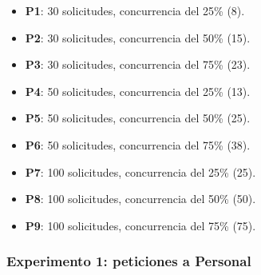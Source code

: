\begin{itemize}
	\item \textbf{P1}: 30 solicitudes, concurrencia del 25\% (8).
	\item \textbf{P2}: 30 solicitudes, concurrencia del 50\% (15).
	\item \textbf{P3}: 30 solicitudes, concurrencia del 75\% (23).
	\item \textbf{P4}: 50 solicitudes, concurrencia del 25\% (13).
	\item \textbf{P5}: 50 solicitudes, concurrencia del 50\% (25).
	\item \textbf{P6}: 50 solicitudes, concurrencia del 75\% (38).
	\item \textbf{P7}: 100 solicitudes, concurrencia del 25\% (25).
	\item \textbf{P8}: 100 solicitudes, concurrencia del 50\% (50).
	\item \textbf{P9}: 100 solicitudes, concurrencia del 75\% (75).
\end{itemize}

\newpage
\subsubsection{Experimento 1: peticiones a Personal}

